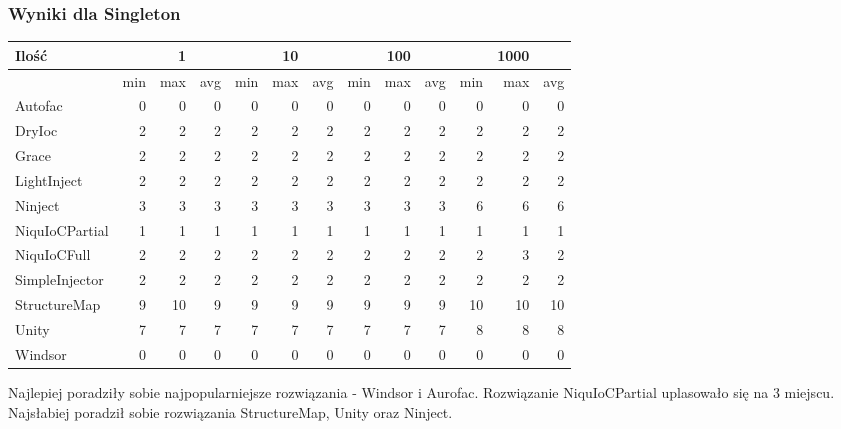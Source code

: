 \documentclass[12pt]{article}
\begin{document}
\subsubsection{Wyniki dla Singleton}
\begin{center}
\begin{small}
	\begin{tabular}{ | l | r r r | r r r | r r r | r r r | }
    		\hline
     		Ilość & & 1 & & & 10 & & & 100 & & & 1000 & \\ \hline
     		 & min & max & avg & min & max & avg & min & max & avg & min & max & avg \\ \hline
    		Autofac & 0 & 0 & 0 & 0 & 0 & 0 & 0 & 0 & 0 & 0 & 0 & 0 \\ \hline
   		DryIoc & 2 & 2 & 2 & 2 & 2 & 2 & 2 & 2 & 2 & 2 & 2 & 2 \\ \hline
		Grace & 2 & 2 & 2 & 2 & 2 & 2 & 2 & 2 & 2 & 2 & 2 & 2 \\ \hline
		LightInject & 2 & 2 & 2 & 2 & 2 & 2 & 2 & 2 & 2 & 2 & 2 & 2 \\ \hline
		Ninject & 3 & 3 & 3 & 3 & 3 & 3 & 3 & 3 & 3 & 6 & 6 & 6 \\ \hline
		NiquIoCPartial & 1 & 1 & 1 & 1 & 1 & 1 & 1 & 1 & 1 & 1 & 1 & 1 \\ \hline
		NiquIoCFull & 2 & 2 & 2 & 2 & 2 & 2 & 2 & 2 & 2 & 2 & 3 & 2 \\ \hline
		SimpleInjector & 2 & 2 & 2 & 2 & 2 & 2 & 2 & 2 & 2 & 2 & 2 & 2 \\ \hline
		StructureMap & 9 & 10 & 9 & 9 & 9 & 9 & 9 & 9 & 9 & 10 & 10 & 10 \\ \hline
		Unity & 7 & 7 & 7 & 7 & 7 & 7 & 7 & 7 & 7 & 8 & 8 & 8 \\ \hline
		Windsor & 0 & 0 & 0 & 0 & 0 & 0 & 0 & 0 & 0 & 0 & 0 & 0 \\
    		\hline
  	\end{tabular}
\end{small}
\end{center}

Najlepiej poradziły sobie najpopularniejsze rozwiązania - Windsor i Aurofac. Rozwiązanie NiquIoCPartial uplasowało się na 3 miejscu. Najsłabiej poradził sobie rozwiązania StructureMap, Unity oraz Ninject.
\end{document}
